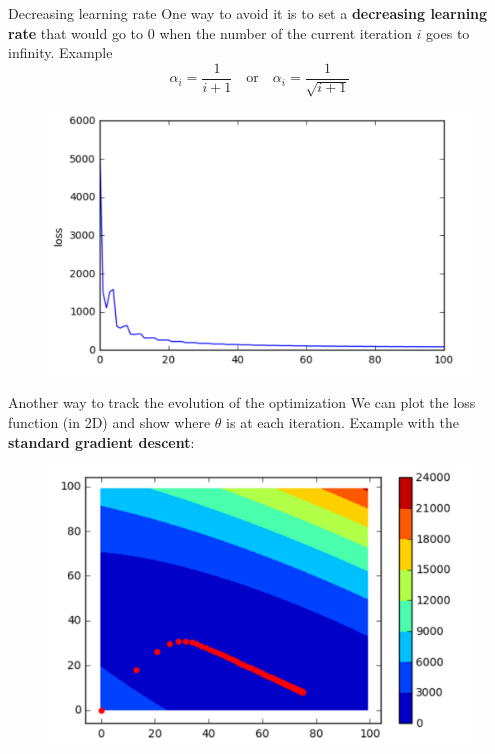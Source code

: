 \documentclass{beamer}
\newcommand{\1}[1]{\mathbbm{1}\left[#1\right]}
\begin{document}
\begin{frame}{Decreasing learning rate}
One way to avoid it is to set a \textbf{decreasing learning rate} that would go to 0 when the number of the current iteration $i$ goes to infinity. Example
$$\alpha_i = \dfrac{1}{i+1} \quad \text{or} \quad \alpha_i = \dfrac{1}{\sqrt{i+1}}$$
\vfill
\pause
\begin{figure}
\centering
\includegraphics[width=.8\linewidth]{images/sgd_decreasing_alpha.png}
\end{figure}
\end{frame}

\begin{frame}{Another way to track the evolution of the optimization}
We can plot the loss function (in 2D) and show where $\theta$ is at each iteration. Example with the \textbf{standard gradient descent}:
\begin{figure}
\centering
\includegraphics[width=\linewidth]{images/theta_evolution_gd.png}
\end{figure}
\end{frame}
\end{document}
